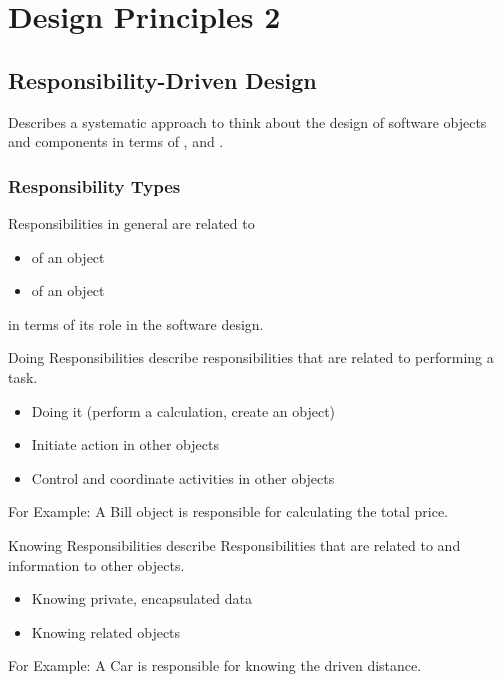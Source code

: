 \documentclass[
../../Software_Engineering_Summary.tex,
]
{subfiles}
\begin{document}
\section{Design Principles 2}
\subsection{Responsibility-Driven Design}
\begin{defbox*}
    Describes a systematic approach to think about the design of software objects and components in terms of ,  and .
\end{defbox*}

\subsubsection{Responsibility Types}
Responsibilities in general are related to
\begin{itemize}
    \item {} of an object
    \item {} of an object
\end{itemize}
in terms of its role in the software design.

\begin{defbox}
    Doing Responsibilities describe responsibilities that are related to performing a task.
    \begin{itemize}
        \item Doing it (perform a calculation, create an object)
        \item Initiate action in other objects
        \item Control and coordinate activities in other objects
    \end{itemize}
    For Example: A Bill object is responsible for calculating the total price.
\end{defbox}

\begin{defbox}
    Knowing Responsibilities describe Responsibilities that are related to  and  information to other objects.
    \begin{itemize}
        \item Knowing private, encapsulated data
        \item Knowing related objects
    \end{itemize}
    For Example: A Car is responsible for knowing the driven distance.
\end{defbox}
\end{document}
